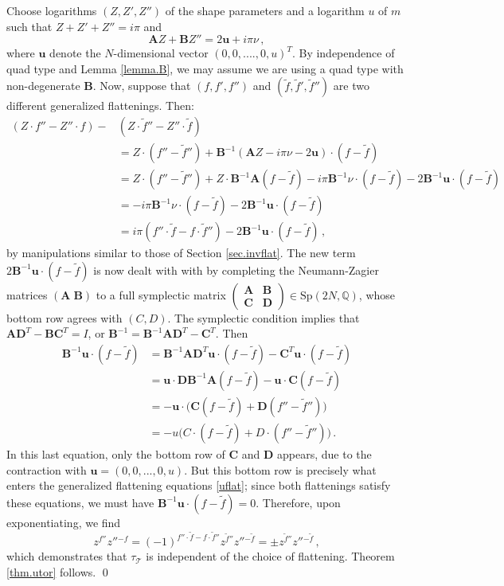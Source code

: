 \documentclass[12pt]{amsart}
\newcommand{\lbl}{\label}
\renewcommand{\eta}{\nu}
\theoremstyle{definition}
\def\be{  \begin{equation} }
\def\ee{  \end{equation} }
\def\Sp{\mathrm{Sp}}
\newcommand{\CT}{\mathcal{T}}
\newcommand{\wt}{\widetilde}
\newcommand{\mb}{\mathbf}
\numberwithin{equation}{section}
\begin{document}
Choose logarithms $(Z,Z',Z'')$ of the shape parameters and a logarithm $u$ of $m$ such that $Z+Z'+Z''=i\pi$ and
%
\be 
\lbl{uveceqs} 
\mb AZ+\mb BZ''=2\bm u+i\pi \eta\,, 
\ee
%
where $\bm{u}$ denote the $N$-dimensional vector $(0,0,....,0,u)^T$.
By independence of quad type and Lemma \ref{lemma.B}, we may assume we are using a quad type with non-degenerate $\mb B$.
Now, suppose that $(f,f',f'')$ and $(\wt f,\wt f',\wt f'')$ are two 
different generalized flattenings. Then:
%
\begin{align*} 
(Z\cdot f''-Z''\cdot f)-&(Z\cdot \wt f''-Z''\cdot \wt f) \\&=
 Z\cdot (f''-\wt f'') + \mb B^{-1}(\mb A Z-i\pi \eta -2\bm u)\cdot (f-\wt f) \\
 &= Z\cdot (f''-\wt f'') 
+  Z\cdot \mb B^{-1}\mb A(f-\wt f)-i\pi\mb B^{-1}\eta \cdot (f-\wt f) 
-2\mb B^{-1}\bm u\cdot(f-\tilde f) \\
 &= -i\pi\mb B^{-1}\eta\cdot (f-\wt f) -2\mb B^{-1}\bm u\cdot(f-\tilde f)\\
 &= i\pi (f''\cdot \wt f-f\cdot \wt f'') -2\mb B^{-1}\bm u\cdot(f-\tilde f)\,,
\end{align*}
%
by manipulations similar to those of Section \ref{sec.invflat}.
The new term 
$2\mb B^{-1}\bm u\cdot(f-\tilde f)$ is now dealt with with by completing the 
Neumann-Zagier matrices $(\mb A\;\mb B)$ to a full symplectic matrix 
$\left(\begin{smallmatrix} \mb A & \mb B \\ \mb C & 
\mb D\end{smallmatrix}\right) \in \Sp(2N,\mathbb Q)$, whose bottom row agrees with $(C,D)$. The symplectic 
condition implies that $\mb A \mb D^T-\mb B \mb C^T=I$, or 
$\mb B^{-1}=\mb B^{-1}\mb A\mb D^T-\mb C^T$. Then
%
\begin{align*} 
\mb B^{-1}\bm u\cdot(f-\tilde f) &=
 \mb B^{-1}\mb A\mb D^T \bm u\cdot (f-\tilde f) 
- \mb C^T \bm u\cdot (f-\tilde f) \\
 &= \bm u\cdot \mb D\mb B^{-1}\mb A (f-\tilde f) 
- \bm u\cdot \mb C(f-\tilde f) \\
 &= -\bm u\cdot\big( \mb C(f-\tilde f)+\mb D(f''-\tilde f'')\big) \\
 &= -u\big(C\cdot(f-\tilde f)+D\cdot (f''-\tilde f'')\big)\,.
\end{align*}
%
In this last equation, only the bottom row of $\mb C$ and $\mb D$ appears, 
due to the contraction with $\bm u = (0,0,...,0,u)$. But this bottom row is 
precisely what enters the generalized flattening equations \eqref{uflat}; since both 
flattenings satisfy these equations, we must have 
$\mb B^{-1}\bm u\cdot (f-\tilde f)=0$. Therefore, upon exponentiating, we find
%
\be z^{f''}z''{}^{-f} = (-1)^{f''\cdot \tilde f-f\cdot \tilde f''} 
z^{\tilde f''}z''{}^{-\tilde f} = \pm z^{\tilde f''}z''{}^{-\tilde f}\,,\ee
%
which demonstrates that $\tau_{\CT}$ is independent of the choice of flattening. Theorem \ref{thm.utor} follows.
\qed
\end{document}
